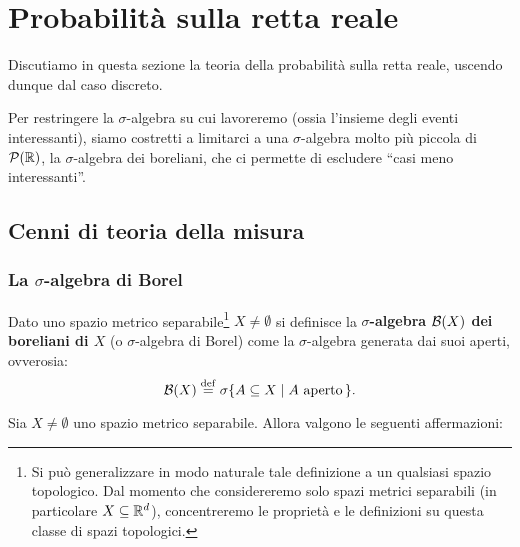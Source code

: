 \chapter{Probabilità sulla retta reale}
\setlength{\parindent}{2pt}

\begin{multicols*}{2}

Discutiamo in questa sezione la teoria della probabilità sulla
retta reale, uscendo dunque dal caso discreto.

Per restringere la $\sigma$-algebra su cui lavoreremo (ossia l'insieme degli
eventi interessanti), siamo costretti a limitarci a una $\sigma$-algebra molto più
piccola di $\mathcal{P}(\mathbb{R})$, la $\sigma$-algebra dei boreliani, che ci permette di escludere
``casi meno interessanti''.

\section{Cenni di teoria della misura}

\subsection{La \texorpdfstring{$\sigma$}{σ}-algebra di Borel}

\begin{definition}
    Dato uno spazio metrico separabile\footnote{
        Si può generalizzare in modo naturale tale definizione a un qualsiasi spazio topologico.
        Dal momento che considereremo solo spazi metrici separabili (in particolare $X \subseteq \mathbb{R}^d$), concentreremo
        le proprietà e le definizioni su questa classe di spazi topologici.} $X \neq \emptyset$
    si definisce la \textbf{$\sigma$-algebra $\BB(X)$ dei boreliani di $X$} (o
    $\sigma$-algebra di Borel)
    come la $\sigma$-algebra generata dai suoi aperti, ovverosia:
    \[
        \mathcal{B}(X) \overset{\mathrm{def}}{=} \sigma \{ A \subseteq X \mid A \text{ aperto}\, \}.
    \]
\end{definition}

\begin{proposition}[Proprietà di $\BB(X)$]
    Sia $X \neq \emptyset$ uno spazio metrico separabile. Allora valgono
    le seguenti affermazioni:


\end{proposition}
\end{multicols*}
